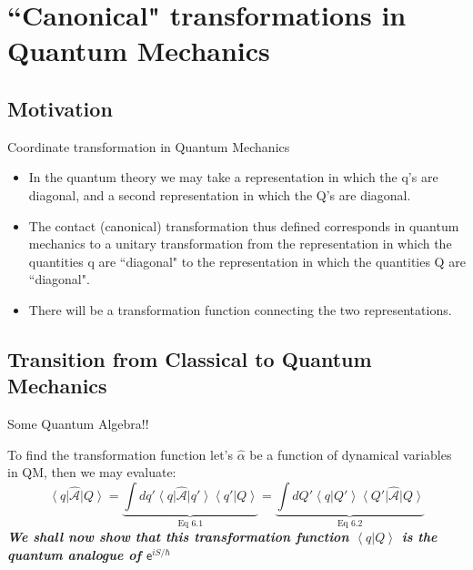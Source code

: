 \documentclass{beamer}
\newcommand{\ket}[1]{\left|#1\right \rangle}
\newcommand{\bra}[1]{\left\langle#1\right |}
\newcommand{\inner}[2]{\left\langle#1|#2\right\rangle}
\renewcommand{\exp}[1]{\mathsf{e}^{#1}}
\begin{document}
\section{``Canonical" transformations in Quantum Mechanics}
\subsection{Motivation}
\begin{frame}{Coordinate transformation in Quantum Mechanics}
\begin{itemize}
    \item In the quantum theory we may take a representation in which the q’s are diagonal, and a second representation in which the Q’s are diagonal.
    \item The contact (canonical) transformation thus defined corresponds in quantum mechanics to a unitary transformation from the representation in which the quantities q are ``diagonal" to the representation in which the quantities Q are ``diagonal".
    \item There will be a transformation function  connecting the two representations. 
\end{itemize}
\end{frame}
\subsection{Transition from Classical to Quantum Mechanics}
\begin{frame}{Some Quantum Algebra!!}

To find the transformation function let's \(\mathcal{\hat{\alpha}}\) be a function of dynamical variables in QM, then we may evaluate:
\begin{equation}
    \label{eq:alpha_trans}
    \bra{q}\mathcal{\hat{A}}\ket{Q} = \underbrace{\int dq' \bra{q} \mathcal{\hat{A}} \ket{q'}\inner{q'}{Q}}_{\text{Eq 6.1}} = \underbrace{\int dQ' \inner{q}{Q'} \bra{Q'}\mathcal{\hat{A}} \ket{Q}}_{\text{Eq 6.2}} 
\end{equation}
\textbf{\textit{We shall now show that this transformation function $\inner{q}{Q}$ is the quantum analogue of $\exp{i S/\hbar}$}}
\end{frame}
\end{document}
